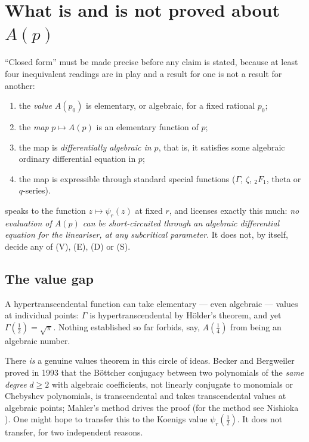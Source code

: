 \section{What is and is not proved about \texorpdfstring{$A(p)$}{A(p)}}
\label{a:sec:scope}

``Closed form'' must be made precise before any claim is stated, because at least
four inequivalent readings are in play and a result for one is not a result for
another:
\begin{enumerate}[leftmargin=*]
\item[\textbf{(V)}] the \emph{value} $A(p_0)$ is elementary, or algebraic, for a
      fixed rational $p_0$;
\item[\textbf{(E)}] the \emph{map} $p\mapsto A(p)$ is an elementary function of
      $p$;
\item[\textbf{(D)}] the map is \emph{differentially algebraic in $p$}, that is, it
      satisfies some algebraic ordinary differential equation in $p$;
\item[\textbf{(S)}] the map is expressible through standard special functions
      ($\Gamma$, $\zeta$, ${}_2F_1$, theta or $q$-series).
\end{enumerate}
 speaks to the function $z\mapsto\psi_r(z)$ at fixed $r$, and
licenses exactly this much: \emph{no evaluation of $A(p)$ can be short-circuited
through an algebraic differential equation for the lineariser, at any subcritical
parameter}. It does not, by itself, decide any of (V), (E), (D) or (S).

\subsection*{The value gap}

A hypertranscendental function can take elementary --- even algebraic --- values at
individual points: $\Gamma$ is hypertranscendental by Hölder's theorem, and yet
$\Gamma(\tfrac12)=\sqrt\pi$. Nothing established so far forbids, say, $A(\tfrac14)$
from being an algebraic number.

There \emph{is} a genuine values theorem in this circle of ideas. Becker and
Bergweiler proved in 1993 \cite{Becker1993} that the Böttcher conjugacy between two
polynomials of the \emph{same degree} $d\ge2$ with algebraic coefficients, not
linearly conjugate to monomials or Chebyshev polynomials, is transcendental and
takes transcendental values at algebraic points; Mahler's method drives the proof
(for the method see Nishioka \cite{Nishioka1996}). One might hope to transfer this
to the Koenigs value $\psi_r(\tfrac12)$. It does not transfer, for two independent
reasons.

